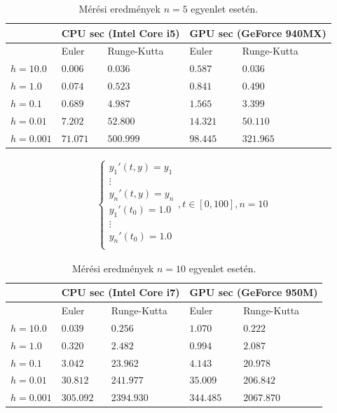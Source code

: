 \begin{table}[h!]
	\centering
	\begin{tabular}{ | p{1.8cm} | p{2.5cm} | p{2.5cm} | p{2.5cm} | p{2.5cm} |}
		\hline  & \multicolumn{2}{|c|}{\textbf{CPU sec (Intel Core i5)}} & \multicolumn{2}{|c|}{\textbf{GPU sec (GeForce 940MX)}}\\ 
		\hline  & Euler & Runge-Kutta & Euler & Runge-Kutta\\ 
		\hline
		$ h = 10.0 $ & $ 0.006 $ & $ 0.036 $ & $ 0.587 $ & $ 0.036 $ \\ 
		\hline
		$ h = 1.0 $ & $ 0.074 $ & $ 0.523 $ & $ 0.841 $ & $ 0.490 $ \\
		\hline
		$ h = 0.1 $ & $ 0.689 $ & $ 4.987 $ & $ 1.565 $ & $ 3.399 $ \\
		\hline
		$ h = 0.01 $ & $ 7.202 $ & $ 52.800 $ & $ 14.321 $ & $ 50.110 $ \\
		\hline
		$ h = 0.001 $ & $ 71.071 $ & $ 500.999 $ & $ 98.445 $ & $ 321.965 $ \\
		\hline
	\end{tabular}
	\caption{Mérési eredmények $ n = 5 $ egyenlet esetén.}
\end{table}

\begin{align}
	\begin{cases}
		y_{1}'(t, y) = y_{1} \\
		\vdots \\
		y_{n}'(t, y) = y_{n}\\
		y_{1}'(t_{0}) = 1.0 \\
		\vdots \\
		y_{n}'(t_{0}) = 1.0\\
	\end{cases}
	, t\in[0, 100], n = 10
\end{align}

\begin{table}[h!]
	\centering
	\begin{tabular}{ | p{1.8cm} | p{2.5cm} | p{2.5cm} | p{2.5cm} | p{2.5cm} |}
		\hline  & \multicolumn{2}{|c|}{\textbf{CPU sec (Intel Core i7)}} & \multicolumn{2}{|c|}{\textbf{GPU sec (GeForce 950M)}}\\ 
		\hline  & Euler & Runge-Kutta & Euler & Runge-Kutta\\ 
		\hline
		$ h = 10.0 $ & $ 0.039 $ & $ 0.256 $ & $ 1.070 $ & $ 0.222 $ \\ 
		\hline
		$ h = 1.0 $ & $ 0.320 $ & $ 2.482 $ & $ 0.994 $ & $ 2.087 $ \\
		\hline
		$ h = 0.1 $ & $ 3.042 $ & $ 23.962 $ & $ 4.143 $ & $ 20.978 $ \\
		\hline
		$ h = 0.01 $ & $ 30.812 $ & $ 241.977 $ & $ 35.009 $ & $ 206.842 $ \\
		\hline
		$ h = 0.001 $ & $ 305.092 $ & $ 2394.930 $ & $ 344.485 $ & $ 2067.870 $ \\
		\hline
	\end{tabular}
	\caption{Mérési eredmények $ n = 10 $ egyenlet esetén.}
\end{table}

